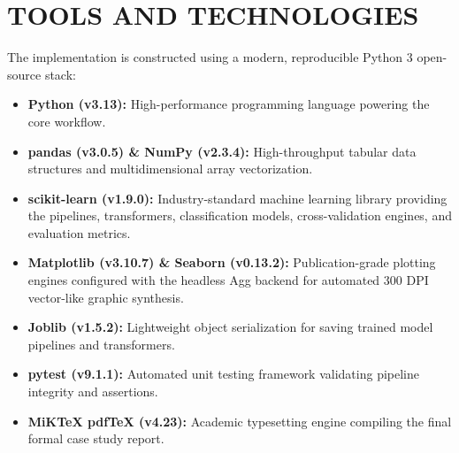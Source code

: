 \section{TOOLS AND TECHNOLOGIES}
The implementation is constructed using a modern, reproducible Python 3 open-source stack:
\begin{itemize}
    \item \textbf{Python (v3.13):} High-performance programming language powering the core workflow.
    \item \textbf{pandas (v3.0.5) \& NumPy (v2.3.4):} High-throughput tabular data structures and multidimensional array vectorization.
    \item \textbf{scikit-learn (v1.9.0):} Industry-standard machine learning library providing the pipelines, transformers, classification models, cross-validation engines, and evaluation metrics.
    \item \textbf{Matplotlib (v3.10.7) \& Seaborn (v0.13.2):} Publication-grade plotting engines configured with the headless Agg backend for automated 300 DPI vector-like graphic synthesis.
    \item \textbf{Joblib (v1.5.2):} Lightweight object serialization for saving trained model pipelines and transformers.
    \item \textbf{pytest (v9.1.1):} Automated unit testing framework validating pipeline integrity and assertions.
    \item \textbf{MiKTeX pdfTeX (v4.23):} Academic typesetting engine compiling the final formal case study report.
\end{itemize}
